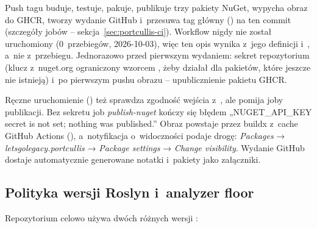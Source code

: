 Push tagu  buduje, testuje, pakuje, publikuje trzy pakiety NuGet, wypycha obraz
do GHCR, tworzy wydanie GitHub i~przesuwa tag główny () na ten commit
(szczegóły jobów -- sekcja~\ref{sec:portcullis-ci}). Workflow nigdy nie został uruchomiony
(0~przebiegów, 2026-10-03), więc ten opis wynika z~jego definicji i~,
a~nie z~przebiegu. Jednorazowo przed pierwszym wydaniem:
sekret repozytorium  (klucz z~nuget.org ograniczony wzorcem
, żeby działał dla pakietów, które jeszcze nie istnieją) i~po
pierwszym pushu obrazu -- upublicznienie pakietu GHCR.

Ręczne uruchomienie () też sprawdza zgodność wejścia
 z~, ale pomija joby publikacji. Bez sekretu
 job \emph{publish-nuget} kończy się błędem „NUGET\_API\_KEY secret
is not set; nothing was published.” Obraz powstaje przez buildx z~cache GitHub Actions
(), a~notyfikacja o~widoczności podaje drogę: \emph{Packages} →
\emph{letsgolegacy.portcullis} → \emph{Package settings} → \emph{Change visibility}. Wydanie
GitHub dostaje automatycznie generowane notatki i~pakiety jako załączniki.


\subsection{Polityka wersji Roslyn i~analyzer floor}\label{sec:portcullis-roslyn}

Repozytorium celowo używa dwóch różnych wersji :

